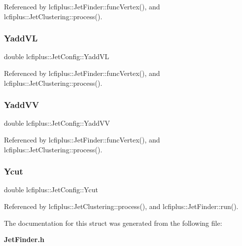 Referenced by lcfiplus\+::\+Jet\+Finder\+::func\+Vertex(), and lcfiplus\+::\+Jet\+Clustering\+::process().

\mbox{\label{structlcfiplus_1_1JetConfig_a81dc48c9e893048e4798a01d0a3f00d2}} 
\subsubsection{Yadd\+VL}
{\footnotesize\ttfamily double lcfiplus\+::\+Jet\+Config\+::\+Yadd\+VL}



Referenced by lcfiplus\+::\+Jet\+Finder\+::func\+Vertex(), and lcfiplus\+::\+Jet\+Clustering\+::process().

\mbox{\label{structlcfiplus_1_1JetConfig_a094a72c64397a9219b792d180e64773e}} 
\subsubsection{Yadd\+VV}
{\footnotesize\ttfamily double lcfiplus\+::\+Jet\+Config\+::\+Yadd\+VV}



Referenced by lcfiplus\+::\+Jet\+Finder\+::func\+Vertex(), and lcfiplus\+::\+Jet\+Clustering\+::process().

\mbox{\label{structlcfiplus_1_1JetConfig_a7f086f8330cfa571ae8246e1087022f0}} 
\subsubsection{Ycut}
{\footnotesize\ttfamily double lcfiplus\+::\+Jet\+Config\+::\+Ycut}



Referenced by lcfiplus\+::\+Jet\+Clustering\+::process(), and lcfiplus\+::\+Jet\+Finder\+::run().



The documentation for this struct was generated from the following file\+:\begin{DoxyCompactItemize}
\item 
\textbf{ Jet\+Finder.\+h}\end{DoxyCompactItemize}
